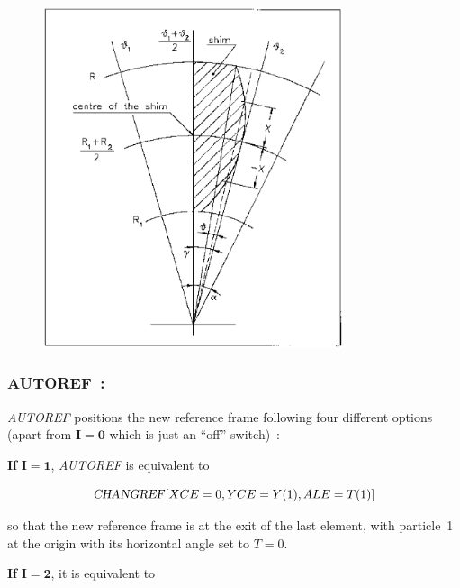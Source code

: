 {\vfill 

\begin{figure}[H]
\centerline{\includegraphics[height=10cm]{Fig13.ps}}
{\setlength{\captionwidth}{10cm}
   }
\end{figure}




\newpage

\subsubsection*{AUTOREF~: \AUTOREFTitl}\label{AUTOREF} 
\medskip

\textsl{AUTOREF} positions the new reference frame following four different options (apart from  $\mathbf{I = 0}$ 
which is just an ``off'' switch)~:
\bigskip

\noindent\textbf{If} $\mathbf{I = 1}$, \textsl{AUTOREF} is equivalent to 

$$ \text{\textsl{CHANGREF}} \lbrack XCE=0, YCE=Y(1), ALE=T(1)\rbrack $$

%
\noindent  so that the new reference frame is at the exit of the last element,
with particle~1 at the origin with its horizontal angle set to $ T=0$.   

\bigskip

\noindent\textbf{If} $\mathbf{I=2}$, it is equivalent to

}
